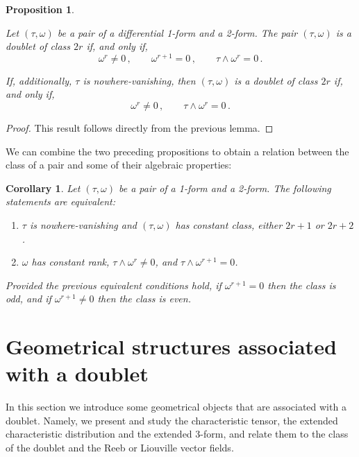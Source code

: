 \documentclass[11pt,twoside]{article}
\theoremstyle{plain}
\newtheorem{proposition}[theorem]{Proposition}
\newtheorem{corollary}[theorem]{Corollary}
\theoremstyle{definition}
\begin{document}
\begin{proposition}\label{prop:even_conditions}
  
    Let $(\tau,\omega)$ be a pair of a differential 1-form and a 2-form. The pair $(\tau,\omega)$ is a doublet of class $2r$ if, and only if,
    \begin{equation}\label{eq:even_conditions}
\omega^r \neq 0\,, \qquad \omega ^{r+1}=0\,, \qquad \tau\wedge \omega^r=0\,.
    \end{equation}

    If, additionally, $\tau$ is nowhere-vanishing, then
    $(\tau,\omega)$ is a doublet of class $2r$ if, and only if,
    $$\omega^r \neq 0\,, \qquad \tau\wedge \omega^r=0\,.$$
    
\end{proposition}
\begin{proof}
    This result follows directly from the previous lemma.
\end{proof}


We can combine the two preceding propositions to obtain 
a relation between the class of a pair and 
some of their algebraic properties:

\begin{corollary}\label{cor:prepair_rank}
Let $(\tau, \omega)$ be a pair of a 1-form and a 2-form. 
The following statements are equivalent:
\begin{enumerate}[$(i)$]
    \item $\tau$ is nowhere-vanishing and $(\tau,\omega)$ has constant class, either $2r+1$ or $2r+2$.
    \item $\omega$ has constant rank,
    $\tau\wedge \omega^r \neq 0$, and $\tau \wedge \omega^{r+1} = 0$.
\end{enumerate}
    Provided the previous equivalent conditions hold, 
    if $\omega^{r+1} = 0$ then the class is odd, 
    and if $\omega^{r+1}\neq 0$ then the class is even.
\end{corollary}



\section{Geometrical structures associated with a doublet}
\label{ch_3}

In this section we introduce some geometrical objects that are associated with a doublet. Namely, we present and study the characteristic tensor, the extended characteristic distribution and the extended 3-form, and relate them to the class of the doublet and the Reeb or Liouville vector fields.
\end{document}
